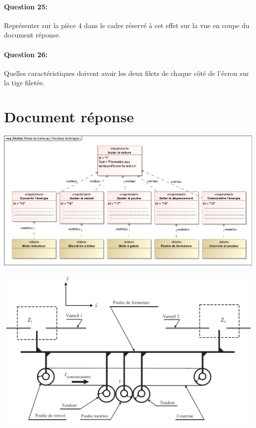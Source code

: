 \paragraph{Question 25:} Représenter sur la pièce 4 dans le cadre réservé à cet effet sur la vue en coupe du document réponse.

\paragraph{Question 26:} Quelles caractéristiques doivent avoir les deux filets de chaque côté de l'écrou sur la tige filetée.

\cleardoublepage

\pagestyle{documentreponse}

\section{Document réponse}


\begin{center}
 \includegraphics[width=\linewidth]{img/fonctions_techniques}
\end{center}


\begin{center}
 \includegraphics[width=0.8\linewidth]{img/DR2}
\end{center}

